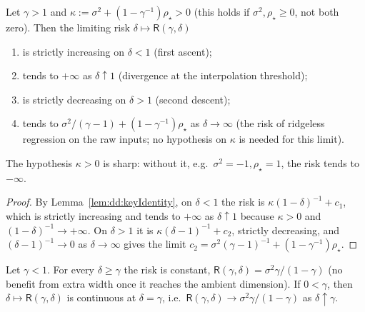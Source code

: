 \begin{theorem}\label{thm:dd:doubleDescent}
  \leanok
Let $\gamma>1$ and $\kappa:=\sigma^2+(1-\gamma^{-1})\rho_\star>0$ (this holds if $\sigma^2,\rho_\star\ge0$, not both zero). Then the
limiting risk $\delta\mapsto\mathsf R(\gamma,\delta)$
\begin{enumerate}
  \item is strictly increasing on $\delta<1$ (first ascent);
  \item tends to $+\infty$ as $\delta\uparrow1$ (divergence at the interpolation threshold);
  \item is strictly decreasing on $\delta>1$ (second descent);
  \item tends to $\sigma^2/(\gamma-1)+(1-\gamma^{-1})\rho_\star$ as $\delta\to\infty$ (the risk of ridgeless regression on the raw
  inputs; no hypothesis on $\kappa$ is needed for this limit).
\end{enumerate}
The hypothesis $\kappa>0$ is sharp: without it, e.g.\ $\sigma^2=-1,\rho_\star=1$, the risk tends to $-\infty$.
\end{theorem}

\begin{proof}
  \leanok
By Lemma~\ref{lem:dd:keyIdentity}, on $\delta<1$ the risk is $\kappa(1-\delta)^{-1}+c_1$, which is strictly increasing and tends to
$+\infty$ as $\delta\uparrow1$ because $\kappa>0$ and $(1-\delta)^{-1}\to+\infty$. On $\delta>1$ it is $\kappa(\delta-1)^{-1}+c_2$,
strictly decreasing, and $(\delta-1)^{-1}\to0$ as $\delta\to\infty$ gives the limit $c_2=\sigma^2(\gamma-1)^{-1}+(1-\gamma^{-1})\rho_\star$.
\end{proof}

\begin{theorem}\label{thm:dd:undercomplete}
  \leanok
Let $\gamma<1$. For every $\delta\ge\gamma$ the risk is constant, $\mathsf R(\gamma,\delta)=\sigma^2\gamma/(1-\gamma)$ (no benefit from extra
width once it reaches the ambient dimension). If $0<\gamma$, then $\delta\mapsto\mathsf R(\gamma,\delta)$ is continuous at $\delta=\gamma$, i.e.\
$\mathsf R(\gamma,\delta)\to\sigma^2\gamma/(1-\gamma)$ as $\delta\uparrow\gamma$.
\end{theorem}

